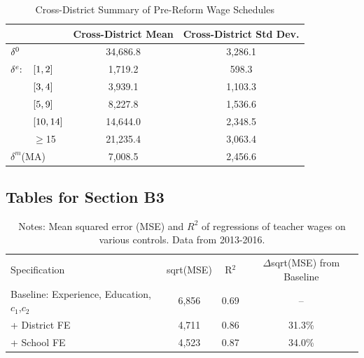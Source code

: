\documentclass[notitlepage,12pt]{article}%
\begin{document}
\begin{table}[ptb]
\caption{Cross-District Summary of Pre-Reform Wage Schedules}%
\label{tab:pre_wage}
\begin{center}%
\begin{tabular}
[c]{llcc}\hline\hline
&  & {\small Cross-District Mean} & {\small Cross-District Std Dev.}\\\hline
\multicolumn{2}{l}{${\small \delta}^{0}$} & {\small 34,686.8} &
{\small 3,286.1}\\
${\small \delta}^{e}{\small :}$ & ${\small [1,2]}$ & {\small 1,719.2} &
{\small 598.3}\\
& ${\small [3,4]}$ & {\small 3,939.1} & {\small 1,103.3}\\
& ${\small [5,9]}$ & {\small 8,227.8} & {\small 1,536.6}\\
& ${\small [10,14]}$ & {\small 14,644.0} & {\small 2,348.5}\\
& $\geq${\small 15} & {\small 21,235.4} & {\small 3,063.4}\\
\multicolumn{2}{l}{$\delta^{m}${\small (MA)}} & {\small 7,008.5} &
{\small 2,456.6}\\\hline\hline
\end{tabular}
\end{center}
\end{table}

\pagebreak\clearpage


\subsection*{Tables for Section B3}

\begin{table}[bh]
\caption{Variation in Salaries Across and Within Districts, 2013-2016}%
\label{tab:salary_var}
\begin{center}%
\begin{tabular}
[c]{lccc}\hline\hline
{\small Specification} & {\small sqrt(MSE)} & {\small R}$^{2}$ & $\Delta
${\small sqrt(MSE) from Baseline}\\
{\small Baseline: Experience, Education, }$c_{1}${\small ,}$c_{2}$ &
{\small 6,856} & {\small 0.69} & {\small --}\\
{\small + District FE} & {\small 4,711} & {\small 0.86} & {\small 31.3\%}\\
{\small + School FE} & {\small 4,523} & {\small 0.87} & {\small 34.0\%}%
\\\hline
\end{tabular}
\caption*{{\footnotesize  Notes: Mean squared error (MSE) and $R^2$ of regressions of teacher wages on various controls. Data from 2013-2016.}}

\end{center}
\end{table}
\end{document}

